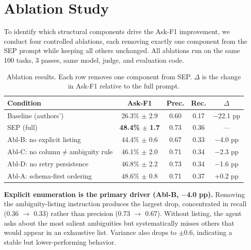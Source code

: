 \documentclass{article} %
\newcommand{\oursystem}{SEP} %
\begin{document}
\section{Ablation Study}
\label{sec:ablation}

To identify which structural components drive the Ask-F1 improvement, we conduct four
controlled ablations, each removing exactly one component from the \oursystem{} prompt
while keeping all others unchanged.
All ablations run on the same 100 tasks, 3 passes, same model, judge, and evaluation code.

\begin{table}[h]
\caption{Ablation results. Each row removes one component from \oursystem{}.
$\Delta$ is the change in Ask-F1 relative to the full prompt.}
\label{tab:ablation}
\begin{center}
\begin{tabular}{lcccc}
\toprule
\textbf{Condition} & \textbf{Ask-F1} & \textbf{Prec.} & \textbf{Rec.} & \textbf{$\Delta$} \\
\midrule
Baseline (authors') & 26.3\% $\pm$ 2.9 & 0.60 & 0.17 & $-$22.1 pp \\
\midrule
\oursystem{} (full) & \textbf{48.4\%} $\pm$ \textbf{1.7} & 0.73 & 0.36 & --- \\
Abl-B: no explicit listing & 44.4\% $\pm$ 0.6 & 0.67 & 0.33 & $-$4.0 pp \\
Abl-C: no column$\neq$ambiguity rule & 46.1\% $\pm$ 2.0 & 0.71 & 0.34 & $-$2.3 pp \\
Abl-D: no retry persistence & 46.8\% $\pm$ 2.2 & 0.73 & 0.34 & $-$1.6 pp \\
Abl-A: schema-first ordering & 48.6\% $\pm$ 0.8 & 0.71 & 0.37 & +0.2 pp \\
\bottomrule
\end{tabular}
\end{center}
\end{table}

\textbf{Explicit enumeration is the primary driver (Abl-B, $-$4.0 pp).}
Removing the ambiguity-listing instruction produces the largest drop, concentrated in
recall (0.36 $\to$ 0.33) rather than precision (0.73 $\to$ 0.67).
Without listing, the agent asks about the most salient ambiguities but systematically
misses others that would appear in an exhaustive list.
Variance also drops to $\pm$0.6, indicating a stable but lower-performing behavior.
\end{document}
